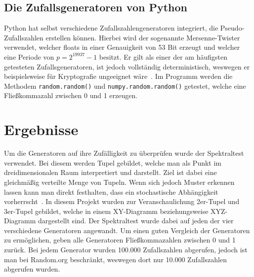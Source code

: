 \documentclass[12pt]{article}
\begin{document}
    \subsection{Die Zufallsgeneratoren von Python}\label{subsec:die-zufallsgeneratoren-von-python}
    Python hat selbst verschiedene Zufallszahlengeneratoren integriert, die Pseudo-Zufallszahlen erstellen können.
    Hierbei wird der sogenannte Mersenne-Twister verwendet, welcher floats in einer Genauigkeit von 53 Bit erzeugt und welcher
    eine Periode von $p=2^{19937}-1$ besitzt.
    Er gilt als einer der am häufigsten getesteten Zufallsgeneratoren, ist jedoch vollständig deterministisch,
    weswegen er beispielsweise für Kryptografie ungeeignet wäre~\cite{python-random,mersenne-twister}.
    Im Programm werden die Methodem \texttt{random.random()} und \texttt{numpy.random.random()} getestet,
    welche eine Fließkommazahl zwischen 0 und 1 erzeugen.


    \section{Ergebnisse}\label{sec:Ergebnisse}
    Um die Generatoren auf ihre Zufälligkeit zu überprüfen wurde der Spektraltest verwendet.
    Bei diesem werden Tupel gebildet, welche man als Punkt im dreidimensionalen Raum interpretiert und darstellt.
    Ziel ist dabei eine gleichmäßig verteilte Menge von Tupeln.
    Wenn sich jedoch Muster erkennen lassen kann man direkt festhalten, dass ein stochastische Abhängigkeit vorherrscht~\cite{spektraltest}.
    In diesem Projekt wurden zur Veranschaulichung 2er-Tupel und 3er-Tupel gebildet,
    welche in einem XY-Diagramm beziehungsweise XYZ-Diagramm dargestellt sind.
    Der Spektraltest wurde dabei auf jeden der vier verschiedene Generatoren angewandt.
    Um einen guten Vergleich der Generatoren zu ermöglichen, geben alle Generatoren Fließkommazahlen zwischen 0 und 1 zurück.
    Bei jedem Generator wurden 100.000 Zufallszahlen abgerufen, jedoch ist man bei Random.org beschränkt,
    weswegen dort nur 10.000 Zufallszahlen abgerufen wurden.
\end{document}
